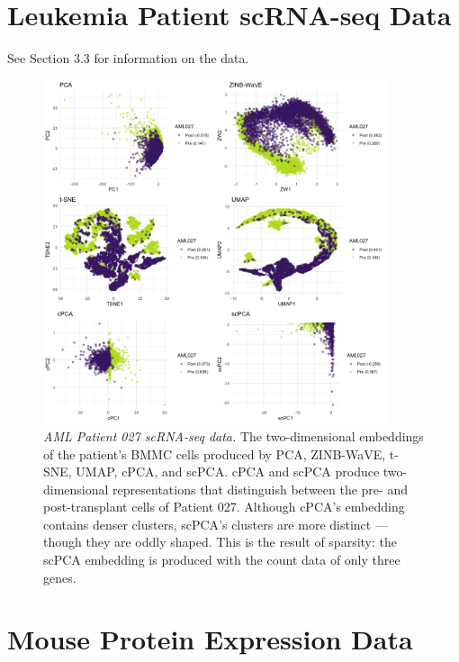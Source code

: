 \documentclass{article}
\begin{document}
\FloatBarrier

\newpage

\section{Leukemia Patient scRNA-seq Data}

See Section 3.3 %
for information on the data.

\begin{figure}[!htbp]
  \centering
  \includegraphics[width=0.9\textwidth]{figures/aml027_results}
  \caption{
  {\em AML Patient 027 scRNA-seq data.} The two-dimensional embeddings of the patient's BMMC cells produced by PCA, ZINB-WaVE, t-SNE, UMAP, cPCA, and scPCA. cPCA and scPCA produce two-dimensional representations that distinguish between the pre- and post-transplant cells of Patient 027. Although cPCA's embedding contains denser clusters, scPCA's clusters are more distinct --- though they are oddly shaped. This is the result of sparsity: the scPCA embedding is produced with the count data of only three genes.}
  \label{fig:comp_leuk_pat2}
\end{figure}
\FloatBarrier

\section{Mouse Protein Expression Data}\label{sup_mice}
\end{document}
